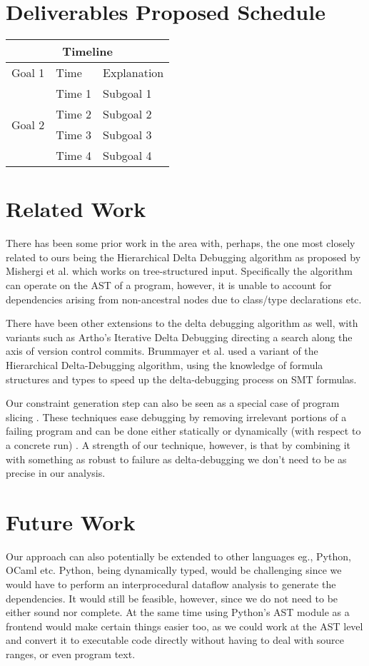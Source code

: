 \documentclass[11pt]{article}
\begin{document}
\section{Deliverables Proposed Schedule}
\begin{tabular}{|l|l|l|}
\hline
\multicolumn{3}{|c|}{Timeline} \\
\hline
Goal 1 & Time & Explanation \\ \hline
\multirow{4}{*}{Goal 2} & Time 1 & Subgoal 1 \\
 & Time 2 & Subgoal 2 \\
 & Time 3 & Subgoal 3 \\
 & Time 4 & Subgoal 4 \\ \hline
\end{tabular}


 
\section{Related Work}
There has been some prior work in the area with, perhaps, the one most closely
related to ours being the Hierarchical Delta Debugging algorithm as proposed by
Mishergi et al. \cite{hdd} which works on tree-structured input. Specifically
the algorithm can operate on the AST of a program, however, it is unable to
account for dependencies arising from non-ancestral nodes due to class/type
declarations etc.

There have been other extensions to the delta debugging algorithm as well, with
variants such as Artho's Iterative Delta Debugging \cite{idd} directing a search
along the axis of version control commits. Brummayer et al. \cite{smt} used a variant of
the Hierarchical Delta-Debugging algorithm, using the knowledge of formula
structures and types to speed up the delta-debugging process on SMT formulas.

Our constraint generation step can also be seen as a special case of program
slicing \cite{weiser81} \cite{tip94}. These techniques ease debugging by
removing irrelevant portions of a failing program and can be done either
statically or dynamically (with respect to a concrete run) \cite{agrawal90}. A
strength of our technique, however, is that by combining it with something as
robust to failure as delta-debugging we don't need to be as precise in our
analysis.


\section{Future Work}
Our approach can also potentially be extended to other languages eg., Python,
OCaml etc. Python, being dynamically typed, would be challenging since we would
have to perform an interprocedural dataflow analysis to generate the
dependencies. It would still be feasible, however, since we do not need to be
either sound nor complete. At the same time using Python's AST module as a
frontend would make certain things easier too, as we could work at the AST level
and convert it to executable code directly without having to deal with source
ranges, or even program text.




\end{document}
